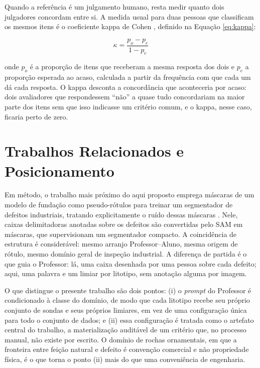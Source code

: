 Quando a referência é um julgamento humano, resta medir quanto dois julgadores concordam entre si. A medida usual para duas pessoas que classificam os mesmos itens é o coeficiente kappa de Cohen \cite{kappa_cohen1960}, definido na Equação \ref{eq:kappa}:

\begin{equation}
  \kappa = \frac{p_o - p_e}{1 - p_e}
  \label{eq:kappa}
\end{equation}

\noindent onde $p_o$ é a proporção de itens que receberam a mesma resposta dos dois e $p_e$ a proporção esperada ao acaso, calculada a partir da frequência com que cada um dá cada resposta. O kappa desconta a concordância que aconteceria por acaso: dois avaliadores que respondessem ``não'' a quase tudo concordariam na maior parte dos itens sem que isso indicasse um critério comum, e o kappa, nesse caso, ficaria perto de zero.

\section{Trabalhos Relacionados e Posicionamento}
\label{sec:relacionados}

Em método, o trabalho mais próximo do aqui proposto emprega máscaras de um modelo de fundação como pseudo-rótulos para treinar um segmentador de defeitos industriais, tratando explicitamente o ruído dessas máscaras \cite{boxes2pixels_lendering2026}. Nele, caixas delimitadoras anotadas sobre os defeitos são convertidas pelo SAM em máscaras, que supervisionam um segmentador compacto. A coincidência de estrutura é considerável: mesmo arranjo Professor--Aluno, mesma origem de rótulo, mesmo domínio geral de inspeção industrial. A diferença de partida é o que guia o Professor: lá, uma caixa desenhada por uma pessoa sobre cada defeito; aqui, uma palavra e um limiar por litotipo, sem anotação alguma por imagem.

O que distingue o presente trabalho são dois pontos: (i) o \textit{prompt} do Professor é condicionado à classe do domínio, de modo que cada litotipo recebe seu próprio conjunto de sondas e seus próprios limiares, em vez de uma configuração única para todo o conjunto de dados; e (ii) essa configuração é tratada como o artefato central do trabalho, a materialização auditável de um critério que, no processo manual, não existe por escrito. O domínio de rochas ornamentais, em que a fronteira entre feição natural e defeito é convenção comercial e não propriedade física, é o que torna o ponto (ii) mais do que uma conveniência de engenharia.

